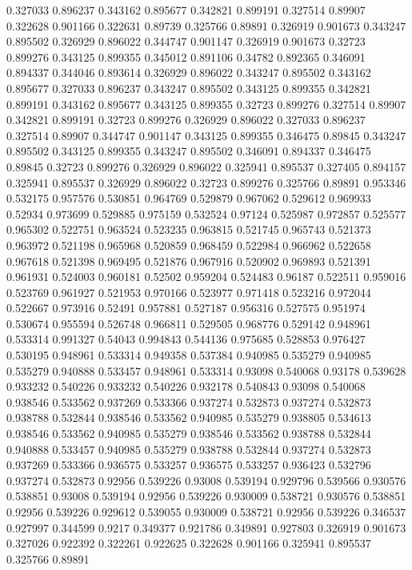 0.327033 0.896237
0.343162 0.895677
0.342821 0.899191
0.327514 0.89907
0.322628 0.901166
0.322631 0.89739
0.325766 0.89891
0.326919 0.901673
0.343247 0.895502
0.326929 0.896022
0.344747 0.901147
0.326919 0.901673
0.32723 0.899276
0.343125 0.899355
0.345012 0.891106
0.34782 0.892365
0.346091 0.894337
0.344046 0.893614
0.326929 0.896022
0.343247 0.895502
0.343162 0.895677
0.327033 0.896237
0.343247 0.895502
0.343125 0.899355
0.342821 0.899191
0.343162 0.895677
0.343125 0.899355
0.32723 0.899276
0.327514 0.89907
0.342821 0.899191
0.32723 0.899276
0.326929 0.896022
0.327033 0.896237
0.327514 0.89907
0.344747 0.901147
0.343125 0.899355
0.346475 0.89845
0.343247 0.895502
0.343125 0.899355
0.343247 0.895502
0.346091 0.894337
0.346475 0.89845
0.32723 0.899276
0.326929 0.896022
0.325941 0.895537
0.327405 0.894157
0.325941 0.895537
0.326929 0.896022
0.32723 0.899276
0.325766 0.89891
0.953346 0.532175
0.957576 0.530851
0.964769 0.529879
0.967062 0.529612
0.969933 0.52934
0.973699 0.529885
0.975159 0.532524
0.97124 0.525987
0.972857 0.525577
0.965302 0.522751
0.963524 0.523235
0.963815 0.521745
0.965743 0.521373
0.963972 0.521198
0.965968 0.520859
0.968459 0.522984
0.966962 0.522658
0.967618 0.521398
0.969495 0.521876
0.967916 0.520902
0.969893 0.521391
0.961931 0.524003
0.960181 0.52502
0.959204 0.524483
0.96187 0.522511
0.959016 0.523769
0.961927 0.521953
0.970166 0.523977
0.971418 0.523216
0.972044 0.522667
0.973916 0.52491
0.957881 0.527187
0.956316 0.527575
0.951974 0.530674
0.955594 0.526748
0.966811 0.529505
0.968776 0.529142
0.948961 0.533314
0.991327 0.54043
0.994843 0.544136
0.975685 0.528853
0.976427 0.530195
0.948961 0.533314
0.949358 0.537384
0.940985 0.535279
0.940985 0.535279
0.940888 0.533457
0.948961 0.533314
0.93098 0.540068
0.93178 0.539628
0.933232 0.540226
0.933232 0.540226
0.932178 0.540843
0.93098 0.540068
0.938546 0.533562
0.937269 0.533366
0.937274 0.532873
0.937274 0.532873
0.938788 0.532844
0.938546 0.533562
0.940985 0.535279
0.938805 0.534613
0.938546 0.533562
0.940985 0.535279
0.938546 0.533562
0.938788 0.532844
0.940888 0.533457
0.940985 0.535279
0.938788 0.532844
0.937274 0.532873
0.937269 0.533366
0.936575 0.533257
0.936575 0.533257
0.936423 0.532796
0.937274 0.532873
0.92956 0.539226
0.93008 0.539194
0.929796 0.539566
0.930576 0.538851
0.93008 0.539194
0.92956 0.539226
0.930009 0.538721
0.930576 0.538851
0.92956 0.539226
0.929612 0.539055
0.930009 0.538721
0.92956 0.539226
0.346537 0.927997
0.344599 0.9217
0.349377 0.921786
0.349891 0.927803
0.326919 0.901673
0.327026 0.922392
0.322261 0.922625
0.322628 0.901166
0.325941 0.895537
0.325766 0.89891
